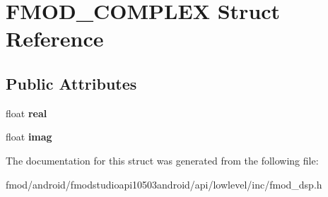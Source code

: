 \hypertarget{struct_f_m_o_d___c_o_m_p_l_e_x}{\section{F\+M\+O\+D\+\_\+\+C\+O\+M\+P\+L\+E\+X Struct Reference}
\label{struct_f_m_o_d___c_o_m_p_l_e_x}
}
\subsection*{Public Attributes}
\begin{DoxyCompactItemize}
\item 
\hypertarget{struct_f_m_o_d___c_o_m_p_l_e_x_ab57c2a7e564944d3ed15c9fcd6021319}{float {\bfseries real}}\label{struct_f_m_o_d___c_o_m_p_l_e_x_ab57c2a7e564944d3ed15c9fcd6021319}

\item 
\hypertarget{struct_f_m_o_d___c_o_m_p_l_e_x_a674759f9c9eedd714ff22ee305cf46a0}{float {\bfseries imag}}\label{struct_f_m_o_d___c_o_m_p_l_e_x_a674759f9c9eedd714ff22ee305cf46a0}

\end{DoxyCompactItemize}


The documentation for this struct was generated from the following file\+:\begin{DoxyCompactItemize}
\item 
fmod/android/fmodstudioapi10503android/api/lowlevel/inc/fmod\+\_\+dsp.\+h\end{DoxyCompactItemize}
